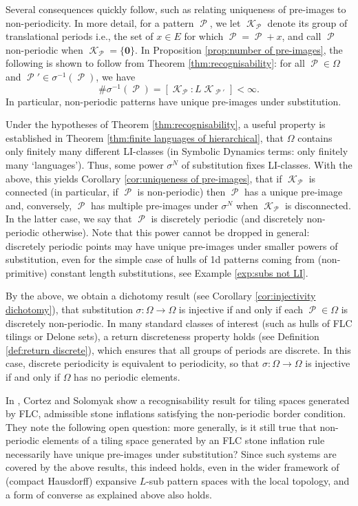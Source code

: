 \documentclass[11pt]{amsart}
\numberwithin{equation}{section}
\theoremstyle{plain}
\theoremstyle{definition}
\newcommand{\sub}{\sigma}
\DeclareMathOperator{\cP}{\mathcal{P}}
\DeclareMathOperator{\cK}{\mathcal{K}}
\begin{document}
Several consequences quickly follow, such as relating uniqueness of pre-images to non-periodicity. In more detail, for a pattern \(\cP\), we let \(\cK_{\cP}\) denote its group of translational periods i.e., the set of \(x \in E\) for which \(\cP = \cP+x\), and call \(\cP\) non-periodic when \(\cK_{\cP} = \{\mathbf{0}\}\). In Proposition \ref{prop:number of pre-images}, the following is shown to follow from Theorem \ref{thm:recognisability}: for all \(\cP \in \Omega\) and \(\cP' \in \sub^{-1}(\cP)\), we have
\[
\# \sub^{-1}(\cP) = [\cK_{\cP} : L \cK_{\cP'}] < \infty .
\]
In particular, non-periodic patterns have unique pre-images under substitution.

Under the hypotheses of Theorem \ref{thm:recognisability}, a useful property is established in Theorem \ref{thm:finite languages of hierarchical}, that \(\Omega\) contains only finitely many different LI-classes \cite{BG13} (in Symbolic Dynamics terms: only finitely many `languages'). Thus, some power \(\sub^N\) of substitution fixes LI-classes. With the above, this yields Corollary \ref{cor:uniqueness of pre-images}, that if \(\cK_{\cP}\) is connected (in particular, if \(\cP\) is non-periodic) then \(\cP\) has a unique pre-image and, conversely, \(\cP\) has multiple pre-images under \(\sub^N\) when \(\cK_{\cP}\) is disconnected. In the latter case, we say that \(\cP\) is discretely periodic (and discretely non-periodic otherwise). Note that this power cannot be dropped in general: discretely periodic points may have unique pre-images under smaller powers of substitution, even for the simple case of hulls of 1d patterns coming from (non-primitive) constant length substitutions, see Example \ref{exp:subs not LI}.

By the above, we obtain a dichotomy result (see Corollary \ref{cor:injectivity dichotomy}), that substitution \(\sub \colon \Omega \to \Omega\) is injective if and only if each \(\cP \in \Omega\) is discretely non-periodic. In many standard classes of interest (such as hulls of FLC tilings or Delone sets), a return discreteness property holds (see Definition \ref{def:return discrete}), which ensures that all groups of periods are discrete. In this case, discrete periodicity is equivalent to periodicity, so that \(\sub \colon \Omega \to \Omega\) is injective if and only if \(\Omega\) has no periodic elements.

In \cite[Theorem 4.4]{CS11}, Cortez and Solomyak show a recognisability result for tiling spaces generated by FLC, admissible stone inflations satisfying the non-periodic border condition. They note the following open question: more generally, is it still true that non-periodic elements of a tiling space generated by an FLC stone inflation rule necessarily have unique pre-images under substitution? Since such systems are covered by the above results, this indeed holds, even in the wider framework of (compact Hausdorff) expansive \(L\)-sub pattern spaces with the local topology, and a form of converse as explained above also holds.
\end{document}
